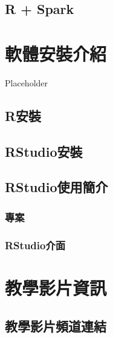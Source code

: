 \documentclass[
]{book}
\begin{document}
\hypertarget{r-spark}{%
\section{R + Spark}\label{r-spark}}

\hypertarget{install}{%
\chapter{軟體安裝介紹}\label{install}}

Placeholder

\hypertarget{rux5b89ux88dd}{%
\section{R安裝}\label{rux5b89ux88dd}}

\hypertarget{rstudioux5b89ux88dd}{%
\section{RStudio安裝}\label{rstudioux5b89ux88dd}}

\hypertarget{rstudioux4f7fux7528ux7c21ux4ecb}{%
\section{RStudio使用簡介}\label{rstudioux4f7fux7528ux7c21ux4ecb}}

\hypertarget{ux5c08ux6848}{%
\subsection{專案}\label{ux5c08ux6848}}

\hypertarget{rstudioux4ecbux9762}{%
\subsection{RStudio介面}\label{rstudioux4ecbux9762}}

\hypertarget{video}{%
\chapter{教學影片資訊}\label{video}}

\hypertarget{ux6559ux5b78ux5f71ux7247ux983bux9053ux9023ux7d50}{%
\section{教學影片頻道連結}\label{ux6559ux5b78ux5f71ux7247ux983bux9053ux9023ux7d50}}
\end{document}
